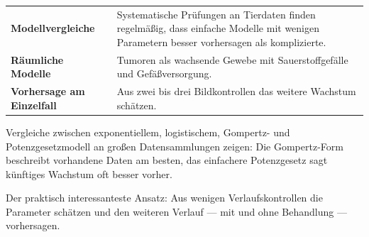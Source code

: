 \begin{forschung}
\begin{center}
{\small
\renewcommand{\arraystretch}{1.45}
\begin{tabular}{@{}P{2.8cm}P{5.4cm}@{}}
\toprule
\textbf{Modell\-vergleiche} & Systematische Prüfungen an Tierdaten finden regelmäßig, dass einfache Modelle mit wenigen Parametern besser vorhersagen als komplizierte.\\
\textbf{Räumliche Modelle} & Tumoren als wachsende Gewebe mit Sauerstoffgefälle und Gefäßversorgung.\\
\textbf{Vorhersage am Einzelfall} & Aus zwei bis drei Bildkontrollen das weitere Wachstum schätzen.\\
\bottomrule
\end{tabular}}
\end{center}

Vergleiche zwischen exponentiellem, logistischem, Gompertz- und Potenzgesetzmodell an großen Datensammlungen zeigen: Die Gompertz-Form beschreibt vorhandene Daten am besten, das einfachere Potenzgesetz sagt künftiges Wachstum oft besser vorher.

\begin{center}
\begin{minipage}{0.88\textwidth}
\end{minipage}
\end{center}

Der praktisch interessanteste Ansatz: Aus wenigen Verlaufskontrollen die Parameter schätzen und den weiteren Verlauf --- mit und ohne Behandlung --- vorhersagen.

\begin{center}
\begin{minipage}{0.88\textwidth}
\end{minipage}
\end{center}
\end{forschung}

